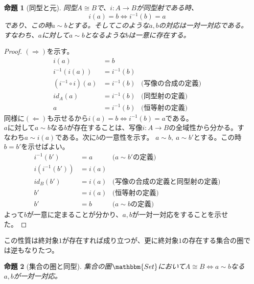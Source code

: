 \documentclass[uplatex,dvipdfmx]{jsarticle}
\newcommand{\cat}[1]{\mathbbm{#1}}
\newcommand{\arrow}{\rightarrow}
\newcommand{\mor}[3]{#1:#2\arrow #3}
\newtheorem{proof}{証明}[section]
\newtheorem{prop}{命題}[section]
\numberwithin{proof}{subsection}
\numberwithin{prop}{subsection}
\numberwithin{define}{subsection}
\begin{document}
  \begin{prop}[同型と元]
    同型$A\cong B$で、$\mor{i}{A}{B}$が同型射である時、
    \[i(a)=b\iff i^{-1}(b)=a\]であり、この時$a\sim b$とする。そしてこのような$a,b$の対応は一対一対応である。\\
    すなわち、$a$に対して$a\sim b$となるような$b$は一意に存在する。
    \begin{center}
    \end{center} 
  \end{prop}
  \begin{proof}
    $(\Longrightarrow)$を示す。
    \begin{align*}
      i(a)&=b\\
      i^{-1}(i(a))&=i^{-1}(b)\\
      (i^{-1}\circ i)(a)&=i^{-1}(b)&\text{(写像の合成の定義)}\\
      id_A(a)&=i^{-1}(b)&\text{(同型射の定義)}\\
      a &=i^{-1}(b)&\text{(恒等射の定義)}
    \end{align*}
    同様に$(\Longleftarrow)$も示せるから$i(a)=b\iff i^{-1}(b)=a$である。\\
    $a$に対して$a\sim b$なる$b$が存在することは、写像$\mor{i}{A}{B}$の全域性から分かる。すなわち$a\sim i(a)$である。次に$b$の一意性を示す。
    $a\sim b,\ a\sim b'$とする。この時$b=b'$を示せばよい。
    \begin{align*}
      i^{-1}(b')&=a&\text{($a\sim b'$の定義)}\\
      i(i^{-1}(b'))&=i(a)\\
      id_B(b')&=i(a)&\text{(写像の合成の定義と同型射の定義)}\\
      b'&=i(a)&\text{(恒等射の定義)}\\
      b'&=b&\text{($a\sim b$の定義)}
    \end{align*}
    よって$b$が一意に定まることが分かり、$a,b$が一対一対応をすることを示せた。
  \end{proof}
  この性質は終対象$1$が存在すれば成り立つが、更に終対象$1$の存在する集合の圏では逆もなりたつ。
  \begin{prop}[集合の圏と同型]
    集合の圏$\cat{Set}$において$A\cong B\iff a\sim b$なる$a,b$が一対一対応。
  \end{prop}  
\end{document}
